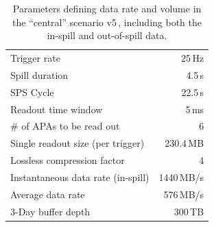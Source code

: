 \documentclass[12pt]{article}
\begin{document}
\begin{table}[htbp]
  \centering
  \begin{tabular}[h]{l|r}
\hline
    Trigger rate & 25\,Hz \\
    Spill duration & 4.5\,s\\
    SPS Cycle & 22.5\,s \\
    Readout time window & 5\,ms \\
    \# of APAs to be read out & 6 \\
    \hline
    Single readout size (per trigger) & 230.4\,MB \\
    Lossless compression factor & 4 \\
    Instantaneous data rate (in-spill) & 1440\,MB/s \\
    Average data rate & 576\,MB/s \\
    \hline
    3-Day buffer depth & 300\,TB \\
    \hline
  \end{tabular}
  \caption{Parameters defining data rate and volume in the ``central'' scenario v5\,\cite{duneDocDb1086}, including both
  the in-spill and out-of-spill data.}
  \label{tab:np04_data_rate}
\end{table}



\end{document}
